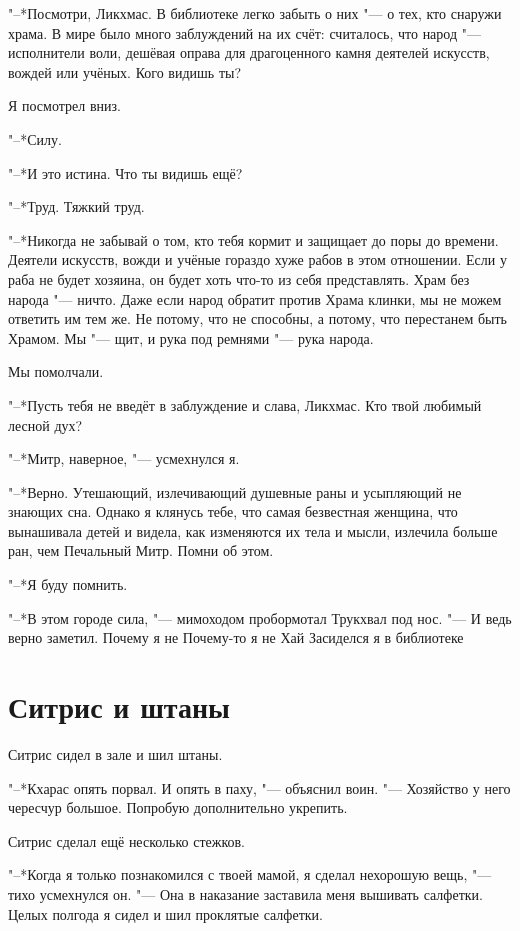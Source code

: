 \documentclass[a4paper,10pt]{book}
\newcommand{\ldotst}{\so{...}\xspace}
\newcommand{\ldotsq}{\so{?\hbox{\hspace{-.212em}}..}\xspace}
\begin{document}
"--*Посмотри, Ликхмас. В библиотеке легко забыть о них "--- о тех, кто снаружи 
храма.
В мире было много заблуждений на их счёт: считалось, что народ "--- исполнители 
воли, дешёвая оправа для драгоценного камня деятелей искусств, вождей или 
учёных. Кого видишь ты?

Я посмотрел вниз.

"--*Силу.

"--*И это истина. Что ты видишь ещё?

"--*Труд. Тяжкий труд.

"--*Никогда не забывай о том, кто тебя кормит и защищает до поры до времени. 
Деятели искусств, вожди и учёные гораздо хуже рабов в этом отношении. Если у 
раба не будет хозяина, он будет хоть что-то из себя представлять. Храм без 
народа "--- ничто. Даже если народ обратит против Храма клинки, мы не можем 
ответить им тем же. Не потому, что не способны, а потому, что перестанем быть 
Храмом. Мы "--- щит, и рука под ремнями "--- рука народа.

Мы помолчали.

"--*Пусть тебя не введёт в заблуждение и слава, Ликхмас. Кто твой любимый 
лесной 
дух?

"--*Митр, наверное, "--- усмехнулся я.

"--*Верно. Утешающий, излечивающий душевные раны и усыпляющий не знающих сна. 
Однако я клянусь тебе, что самая безвестная женщина, что вынашивала детей и 
видела, как изменяются их тела и мысли, излечила больше ран, чем Печальный 
Митр. 
Помни об этом.

"--*Я буду помнить.

"--*В этом городе сила, "--- мимоходом пробормотал Трукхвал под нос. "--- И 
ведь 
верно заметил. Почему я не\ldotsq Почему-то я не\ldotst Хай\ldotst Засиделся я 
в 
библиотеке\ldotst

\section{Ситрис и штаны}

Ситрис сидел в зале и шил штаны.

"--*Кхарас опять порвал. И опять в паху, "--- объяснил воин. "--- Хозяйство у 
него чересчур большое. Попробую дополнительно укрепить.

Ситрис сделал ещё несколько стежков.

"--*Когда я\ldotst только познакомился с твоей мамой, я сделал нехорошую вещь, 
"--- тихо усмехнулся он. "--- Она в наказание заставила меня вышивать салфетки. 
Целых полгода я сидел и шил проклятые салфетки.
\end{document}

